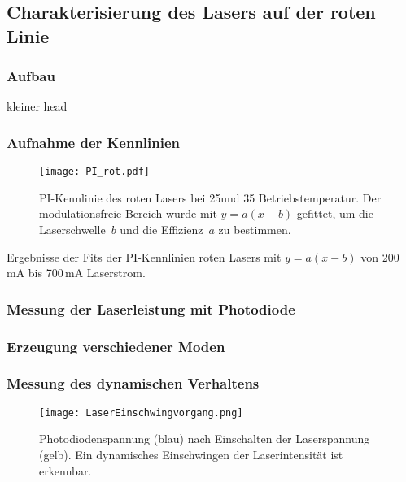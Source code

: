\subsection{Charakterisierung des Lasers auf der roten Linie}

\subsubsection{Aufbau}

kleiner head

\subsubsection{Aufnahme der Kennlinien}


\begin{figure}[H]
\begin{center}
  \texttt{[image: PI\_rot.pdf]}
  \caption{PI-Kennlinie des roten Lasers bei 25\grad und 35\grad
  Betriebstemperatur. Der modulationsfreie Bereich wurde mit $y=a(x-b)$
  gefittet, um die Laserschwelle~$b$ und die Effizienz~$a$ zu bestimmen.}
  \label{img:PI_rot}
\end{center}
\end{figure}


\begin{table}[htb]
\caption{Ergebnisse der Fits der PI-Kennlinien roten Lasers mit $y=a(x-b)$ von 200\,mA bis
700\,mA Laserstrom.}

\label{tab:Fits_PI_rot}
\end{table}

\FloatBarrier

\subsubsection{Messung der Laserleistung mit Photodiode}



\subsubsection{Erzeugung verschiedener Moden}


\subsubsection{Messung des dynamischen Verhaltens}

\begin{figure}[H]
\begin{center}
  \texttt{[image: LaserEinschwingvorgang.png]}
  \caption{Photodiodenspannung (blau) nach Einschalten der Laserspannung (gelb).
  Ein dynamisches Einschwingen der Laserintensität ist erkennbar.}
  \label{img:Einschwingen}
\end{center}
\end{figure}
